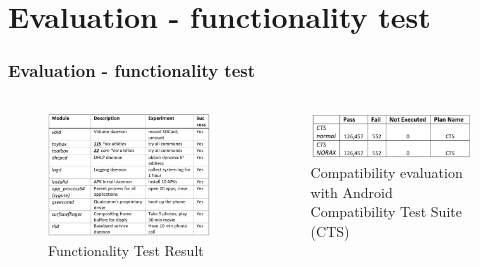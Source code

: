 \documentclass[aspectratio=169]{beamer}
\begin{document}

\section{Evaluation - functionality test}
\begin{frame}
\frametitle{Evaluation - functionality test}
\begin{columns}[c]
\begin{figure}
\includegraphics[width=1.0\linewidth]{figures/eval-function.pdf}
\caption{Functionality Test Result}
\end{figure}
\begin{figure}
\includegraphics[width=1.0\linewidth]{figures/eval-compatibility.pdf}
\caption{Compatibility evaluation with Android Compatibility Test Suite (CTS)}
\end{figure}
\end{columns}
\end{frame}

\end{document}
